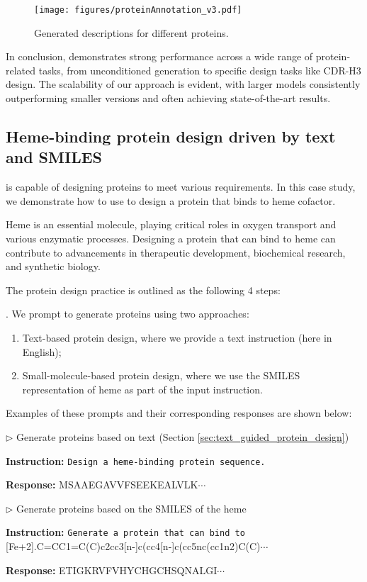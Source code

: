 \begin{figure}[!htbp]
\centering
\texttt{[image: figures/proteinAnnotation\_v3.pdf]}
\caption{Generated descriptions for different proteins.}
\label{fig:protein:protein_understanding}
\end{figure}


In conclusion, \ourM{} demonstrates strong performance across a wide range of protein-related tasks, from unconditioned generation to specific design tasks like CDR-H3 design. The scalability of our approach is evident, with larger models consistently outperforming smaller versions and often achieving state-of-the-art results.


\subsection{Heme-binding protein design driven by text and SMILES}\label{sec:heme_case_study}
\ourM{} is capable of designing proteins to meet various requirements. In this case study, we demonstrate how to use \ourM{} to design a protein that binds to heme cofactor.

Heme is an essential molecule, playing critical roles in oxygen transport and various enzymatic processes. Designing a protein that can bind to heme can contribute to advancements in therapeutic development, biochemical research, and synthetic biology.

The protein design practice is outlined as the following 4 steps:

. We prompt \ourM{} to generate proteins using two approaches:
\begin{enumerate}
\item Text-based protein design, where we provide a text instruction (here in English);
\item Small-molecule-based protein design, where we use the SMILES representation of heme as part of the input instruction.
\end{enumerate}

Examples of these prompts and their corresponding responses are shown below:

\begin{example}
{{
\small
\noindent$\rhd$ {Generate proteins based on text} (Section \ref{sec:text_guided_protein_design})

\noindent\textbf{Instruction:} \texttt{Design a heme-binding protein sequence.} 

\noindent\textbf{Response:} \pro{}MSAAEGAVVFSEEKEALVLK$\cdots$\epro{}


\noindent$\rhd$ { Generate proteins based on the SMILES of the heme}

\noindent\textbf{Instruction:} \texttt{Generate a protein that can bind to} \\
\mol{}[Fe+2].C=CC1=C(C)c2cc3[n-]c(cc4[n-]c(cc5nc(cc1n2)C(C)$\cdots$\emol{}

\noindent\textbf{Response:} \pro{}ETIGKRVFVHYCHGCHSQNALGI$\cdots$\epro{}
}}
\end{example}

